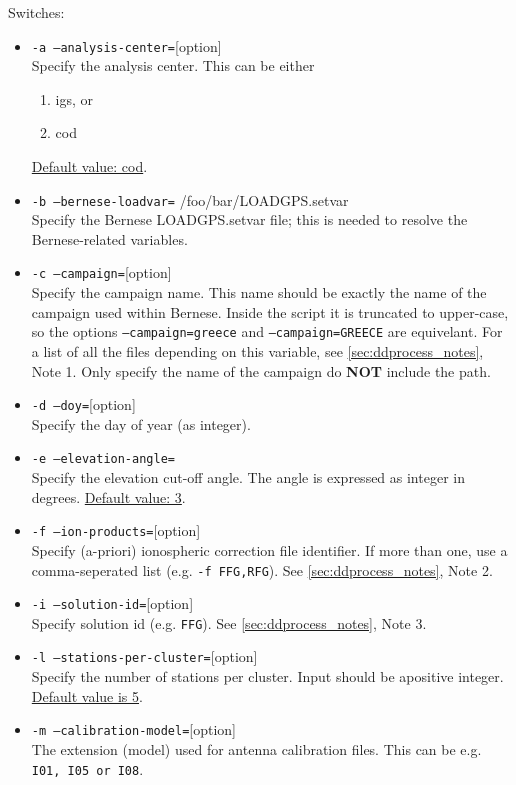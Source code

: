 Switches:
\begin{itemize}
\item \texttt{-a --analysis-center=}[option]\\
Specify the analysis center. This can be either
\begin{enumerate}
\item igs, or
\item cod
\end{enumerate}
\underline{Default value: cod}.
\item \texttt{-b --bernese-loadvar=} /foo/bar/LOADGPS.setvar\\
Specify the Bernese LOADGPS.setvar file; this is needed to resolve the Bernese-related variables.
\item \texttt{-c --campaign=}[option]\\
Specify the campaign name. This name should be exactly the name of the campaign used within
Bernese. Inside the script it is truncated to upper-case, so the options
\texttt{--campaign=greece} and \texttt{--campaign=GREECE} are equivelant. For a list of all the files
depending on this variable, see \autoref{sec:ddprocess_notes}, Note 1.
Only specify the name of the campaign do \textbf{NOT} include the path.
\item \texttt{-d --doy=}[option]\\
Specify the day of year (as integer).
\item \texttt{-e --elevation-angle=}\\
Specify the elevation cut-off angle. The angle is expressed as integer in degrees.
\underline{Default value: 3}.
\item \texttt{-f --ion-products=}[option]\\
Specify (a-priori) ionospheric correction file identifier. If more than one, use a comma-seperated list 
(e.g. \texttt{-f FFG,RFG}). See \autoref{sec:ddprocess_notes}, Note 2.
\item \texttt{-i --solution-id=}[option]\\
Specify solution id (e.g. \texttt{FFG}). See \autoref{sec:ddprocess_notes}, Note 3.
\item \texttt{-l --stations-per-cluster=}[option]\\
Specify the number of stations per cluster. Input should be apositive integer.
\underline{Default value is 5}.
\item \texttt{-m --calibration-model=}[option]\\
The extension (model) used for antenna calibration files. This can be e.g. \texttt{I01, I05 or I08}. 

\end{itemize}
